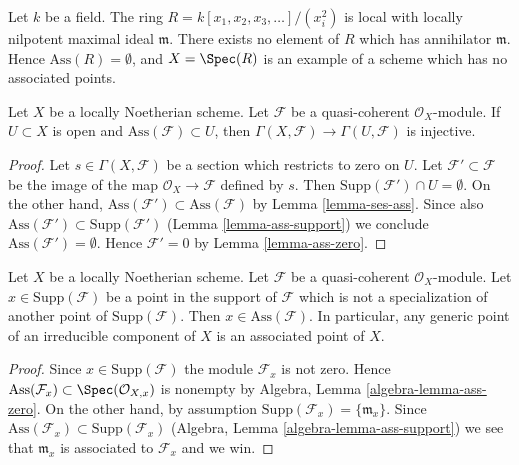 \begin{example}
\label{example-no-associated-prime}
Let $k$ be a field. The ring $R = k[x_1, x_2, x_3, \ldots]/(x_i^2)$
is local with locally nilpotent maximal ideal $\mathfrak m$.
There exists no element of $R$ which has annihilator $\mathfrak m$.
Hence $\text{Ass}(R) = \emptyset$, and $X = \Spec(R)$
is an example of a scheme which has no associated points.
\end{example}

\begin{lemma}
\label{lemma-restriction-injective-open-contains-ass}
Let $X$ be a locally Noetherian scheme. Let $\mathcal{F}$ be a quasi-coherent
$\mathcal{O}_X$-module. If $U \subset X$ is open and
$\text{Ass}(\mathcal{F}) \subset U$, then
$\Gamma(X, \mathcal{F}) \to \Gamma(U, \mathcal{F})$ is injective.
\end{lemma}

\begin{proof}
Let $s \in \Gamma(X, \mathcal{F})$ be a section which restricts to zero on $U$.
Let $\mathcal{F}' \subset \mathcal{F}$ be the image of the map
$\mathcal{O}_X \to \mathcal{F}$ defined by $s$. Then
$\text{Supp}(\mathcal{F}') \cap U = \emptyset$. On the other hand,
$\text{Ass}(\mathcal{F}') \subset \text{Ass}(\mathcal{F})$
by Lemma \ref{lemma-ses-ass}. Since also
$\text{Ass}(\mathcal{F}') \subset \text{Supp}(\mathcal{F}')$
(Lemma \ref{lemma-ass-support}) we conclude
$\text{Ass}(\mathcal{F}') = \emptyset$.
Hence $\mathcal{F}' = 0$ by Lemma \ref{lemma-ass-zero}.
\end{proof}

\begin{lemma}
\label{lemma-minimal-support-in-ass}
Let $X$ be a locally Noetherian scheme.
Let $\mathcal{F}$ be a quasi-coherent $\mathcal{O}_X$-module.
Let $x \in \text{Supp}(\mathcal{F})$ be a point in the support
of $\mathcal{F}$ which is not a specialization of another point of
$\text{Supp}(\mathcal{F})$. Then $x \in \text{Ass}(\mathcal{F})$.
In particular, any generic point of an irreducible component of $X$
is an associated point of $X$.
\end{lemma}

\begin{proof}
Since $x \in \text{Supp}(\mathcal{F})$ the module $\mathcal{F}_x$
is not zero. Hence
$\text{Ass}(\mathcal{F}_x) \subset \Spec(\mathcal{O}_{X, x})$
is nonempty by
Algebra, Lemma \ref{algebra-lemma-ass-zero}.
On the other hand, by assumption
$\text{Supp}(\mathcal{F}_x) = \{\mathfrak m_x\}$.
Since
$\text{Ass}(\mathcal{F}_x) \subset \text{Supp}(\mathcal{F}_x)$
(Algebra, Lemma \ref{algebra-lemma-ass-support})
we see that $\mathfrak m_x$ is associated to $\mathcal{F}_x$
and we win.
\end{proof}


